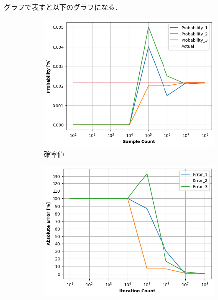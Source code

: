 \documentclass[a4j, titlepage]{jarticle}
\begin{document}
      グラフで表すと以下のグラフになる．

      \begin{figure}[htb]
        \begin{subfigure}[b]{0.38\textwidth}
            \centering
            \includegraphics[height=\textwidth]{../Dir_Dice/img_result6.png}
            \caption{確率値}
            \label{fig:dic6}
        \end{subfigure}
        \hspace{50pt}
        \begin{subfigure}[b]{0.38\textwidth}
          \includegraphics[height=\textwidth]{../Dir_Dice/img_error6.png}

\end{subfigure}
\end{figure}
\end{document}
